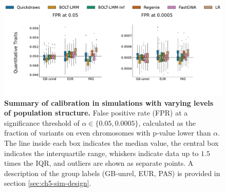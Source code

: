 \begin{figure}[h!]
    \centering
    \includegraphics[width=\textwidth]{figures/sim_calibration/popstructure_fpr.pdf}
    \caption{
    \textbf{Summary of calibration in simulations with varying levels of population structure.}
    False positive rate (FPR) at a significance threshold of $\alpha \in \{0.05, 0.0005\}$, calculated as the fraction of variants on even chromosomes with p-value lower than $\alpha$.
    The line inside each box indicates the median value, the central box indicates the interquartile range, whiskers indicate data up to $1.5$ times the IQR, and outliers are shown as separate points.
    A description of the group labels (GB-unrel, EUR, PAS) is provided in section \ref{sec:ch5-sim-design}.
    }
    \label{fig:sim_calib_pop}
\end{figure}

\newpage

